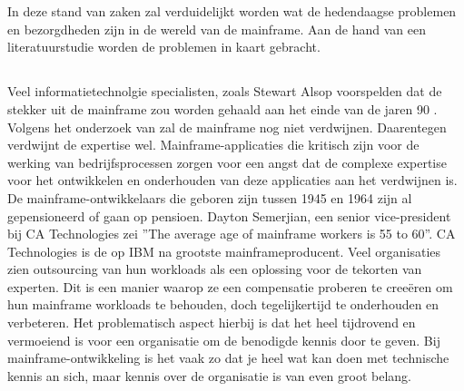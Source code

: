 \chapter{}
\label{ch:stand-van-zaken}



In deze stand van zaken zal verduidelijkt worden wat de hedendaagse problemen en bezorgdheden zijn in de wereld van de mainframe. Aan de hand van een literatuurstudie worden de problemen in kaart gebracht. 

\section{}
\label{sec:Verdwijnen van expertise}

Veel informatietechnolgie specialisten, zoals Stewart Alsop voorspelden dat de stekker uit de mainframe zou worden gehaald aan het einde van de jaren 90 \autocite{McCracken2012}. Volgens het onderzoek van \textcite{Waites2013} zal de mainframe nog niet verdwijnen. Daarentegen verdwijnt de expertise wel. Mainframe-applicaties die kritisch zijn voor de werking van bedrijfsprocessen zorgen voor een angst dat de complexe expertise voor het ontwikkelen en onderhouden van deze applicaties aan het verdwijnen is. De mainframe-ontwikkelaars die geboren zijn tussen 1945 en 1964 zijn al gepensioneerd of gaan op pensioen. Dayton Semerjian, een senior vice-president bij CA Technologies zei ''The average age of mainframe workers is 55 to 60''. CA Technologies is de op IBM na grootste mainframeproducent. Veel organisaties zien outsourcing van hun workloads als een oplossing voor de tekorten van experten. Dit is een manier waarop ze een compensatie proberen te creeëren om hun mainframe workloads te behouden, doch tegelijkertijd te onderhouden en verbeteren. Het problematisch aspect hierbij is dat het heel tijdrovend en vermoeiend is voor een organisatie om de benodigde kennis door te geven. Bij mainframe-ontwikkeling is het vaak zo dat je heel wat kan doen met technische kennis an sich, maar kennis over de organisatie is van even groot belang.  

